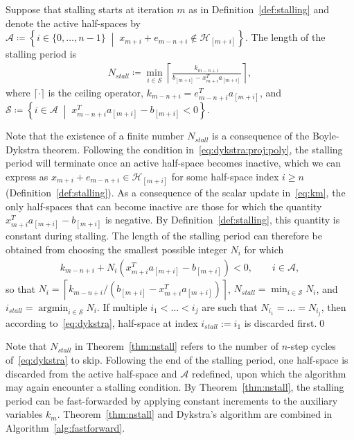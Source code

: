 \documentclass[onecolumn]{autart}
\newcommand{\Argmin}{\ensuremath{\mathop{\mathrm{argmin}}}}
\newcommand{\set}[2]{\left\{ #1 \;\middle|\; #2 \right\}}
\begin{document}
\begin{thm}\label{thm:nstall}
Suppose that stalling starts at iteration $m$ as in Definition~\ref{def:stalling} and denote the active half-spaces by $\mathcal{A}\coloneqq\set{i\in\lbrace 0,\dots,n-1\rbrace}{x_{m+i}+e_{m-n+i}\not\in\mathcal{H}_{[m+i]}}$. The length of the stalling period is
\begin{align}\label{eq:nstall}
N_{stall}\coloneqq\min_{i\in\mathcal{S}} \left\lceil \frac{k_{m-n+i}}{b_{[m+i]}-x_{m+i}^T a_{[m+i]}}\right\rceil,
\end{align}
where $\lceil\cdot\rceil$ is the ceiling operator, $k_{m-n+i}=e_{m-n+i}^T a_{[m+i]}$, and $\mathcal{S}\coloneqq\set{i\in \mathcal{A}}{x_{m-n+i}^T a_{[m+i]} - b_{[m+i]} < 0}$.
\end{thm}

\begin{pf}
Note that the existence of a finite number $N_{stall}$ is a consequence of the Boyle-Dykstra theorem. Following the condition in~\eqref{eq:dykstra:proj:poly}, the stalling period will terminate once an active half-space becomes inactive, which we can express as $x_{m+i}+e_{m-n+i}\in\mathcal{H}_{[m+i]}$ for some half-space index $i\geq n$ (Definition~\ref{def:stalling}). As a consequence of the scalar update in~\eqref{eq:km}, the only half-spaces that can become inactive are those for which the quantity $x_{m+i}^T a_{[m+i]} - b_{[m+i]}$ is negative. By Definition~\ref{def:stalling}, this quantity is constant during stalling. The length of the stalling period can therefore be obtained from choosing the smallest possible integer $N_i$ for which
\begin{align*}
k_{m-n+i}+N_i\left(x_{m+i}^T a_{[m+i]} - b_{[m+i]}\right) < 0,\qquad i\in\mathcal{A},
\end{align*}
so that $N_i=\left\lceil k_{m-n+i} / \left(b_{[m+i]}-x_{m+i}^T a_{[m+i]}\right)\right\rceil$, $N_{stall}=\min_{i\in\mathcal{S}}N_i$, and $i_{stall}=\Argmin_{i\in\mathcal{S}} N_i$. If multiple $i_1<\dots<i_j$ are such that $N_{i_1}=\dots = N_{i_j}$, then according to~\eqref{eq:dykstra}, half-space at index $i_{stall}:= i_1$ is discarded first.\qed
\end{pf}
Note that $N_{stall}$ in Theorem~\ref{thm:nstall} refers to the number of $n$-step cycles of~\eqref{eq:dykstra} to skip. Following the end of the stalling period, one half-space is discarded from the active half-space and $\mathcal{A}$ redefined, upon which the algorithm may again encounter a stalling condition. By Theorem~\ref{thm:nstall}, the stalling period can be fast-forwarded by applying constant increments to the auxiliary variables $k_{m}$. Theorem~\ref{thm:nstall} and Dykstra's algorithm are combined in Algorithm~\ref{alg:fastforward}.
\end{document}
